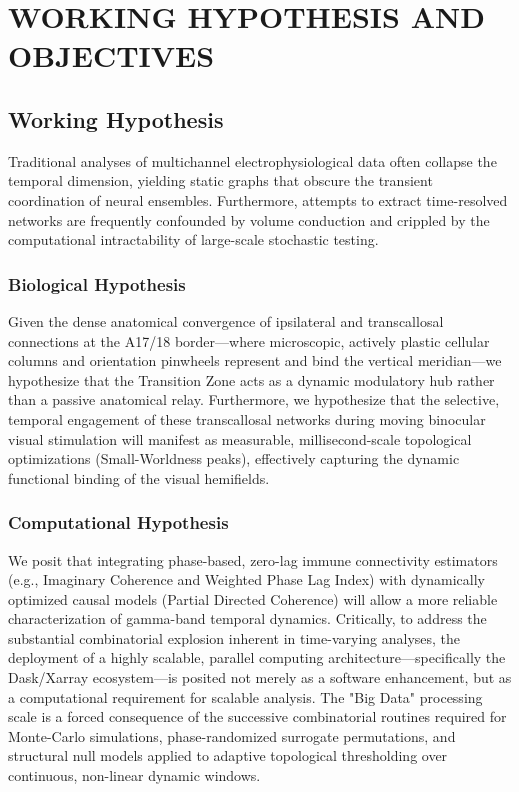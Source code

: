 \chapter{WORKING HYPOTHESIS AND OBJECTIVES}

\section{Working Hypothesis}
Traditional analyses of multichannel electrophysiological data often collapse the temporal dimension, yielding static graphs that obscure the transient coordination of neural ensembles. Furthermore, attempts to extract time-resolved networks are frequently confounded by volume conduction and crippled by the computational intractability of large-scale stochastic testing.

\subsection{Biological Hypothesis}
Given the dense anatomical convergence of ipsilateral and transcallosal connections at the A17/18 border—where microscopic, actively plastic cellular columns and orientation pinwheels represent and bind the vertical meridian—we hypothesize that the Transition Zone acts as a dynamic modulatory hub rather than a passive anatomical relay. Furthermore, we hypothesize that the selective, temporal engagement of these transcallosal networks during moving binocular visual stimulation will manifest as measurable, millisecond-scale topological optimizations (Small-Worldness peaks), effectively capturing the dynamic functional binding of the visual hemifields.

\subsection{Computational Hypothesis}
We posit that integrating phase-based, zero-lag immune connectivity estimators (e.g., Imaginary Coherence and Weighted Phase Lag Index) with dynamically optimized causal models (Partial Directed Coherence) will allow a more reliable characterization of gamma-band temporal dynamics. Critically, to address the substantial combinatorial explosion inherent in time-varying analyses, the deployment of a highly scalable, parallel computing architecture—specifically the Dask/Xarray ecosystem—is posited not merely as a software enhancement, but as a computational requirement for scalable analysis. The "Big Data" processing scale is a forced consequence of the successive combinatorial routines required for Monte-Carlo simulations, phase-randomized surrogate permutations, and structural null models applied to adaptive topological thresholding over continuous, non-linear dynamic windows.

